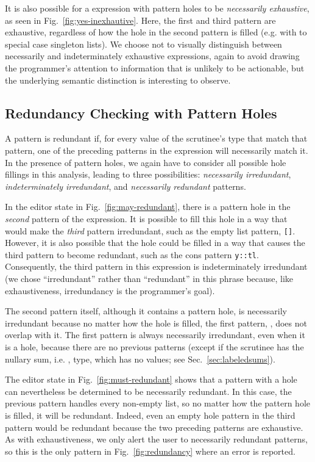 It is also possible for a  expression with pattern holes to be \emph{necessarily exhaustive}, as seen in Fig.~\ref{fig:yes-inexhautive}. Here, the first and third pattern are
exhaustive, regardless of how the hole in the second pattern is filled (e.g. with \li{[]} to special case singleton lists). We choose not to visually distinguish between necessarily and indeterminately exhaustive  expressions, again to avoid drawing
the programmer's attention to information that is unlikely to be actionable, but the
underlying semantic distinction is interesting to observe.

\subsection{Redundancy Checking with Pattern Holes}
\label{sec:hazel-redundancy}
A pattern is redundant if, for every value of the scrutinee's type that match that pattern, one of the preceding patterns in the  expression will necessarily 
match it. In the presence of pattern holes, we again have to consider all possible hole fillings in this analysis, leading to three possibilities: \emph{necessarily irredundant}, \emph{indeterminately irredundant}, and \emph{necessarily redundant} patterns.

In the editor state in Fig.~\ref{fig:may-redundant}, there is a pattern hole in the \emph{second} pattern of the  expression. It is possible to fill this hole in a way that would make the \emph{third} pattern irredundant, such as the empty list pattern, \texttt{[]}. 
However, it is also possible that the hole could be filled in a way that causes the third pattern to become redundant, such as the cons pattern \texttt{y::tl}. Consequently, the third pattern in this  expression is indeterminately irredundant (we chose ``irredundant'' rather than ``redundant'' in this phrase because, like exhaustiveness, irredundancy is the programmer's goal).

The second pattern itself, although it contains a pattern hole, is necessarily irredundant because no matter how the hole is filled, the first pattern, \li{[]}, does not overlap with it. The first pattern is always necessarily irredundant, even when it is a hole, because
there are no previous patterns (except if the scrutinee has the nullary sum, i.e. , type, which has no values; see Sec.~\ref{sec:labeledsums}).

The editor state in Fig.~\ref{fig:must-redundant} shows that a pattern with a hole can nevertheless be determined to be necessarily redundant.
In this case, the previous pattern handles every non-empty list, so no matter how the pattern hole is filled, it will be redundant.
Indeed, even an empty hole pattern in the third pattern would be redundant because the two preceding patterns are exhaustive.
 As with exhaustiveness, we only alert
the user to necessarily redundant patterns, so this is the only pattern in Fig.~\ref{fig:redundancy} where an error is reported.

